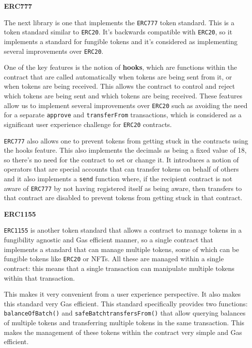 \textbf{ERC777}

The next library is one that implements the \texttt{ERC777} token
standard. This is a token standard similar to \texttt{ERC20}. It's
backwards compatible with \texttt{ERC20}, so it implements a standard
for fungible tokens and it's considered as implementing several
improvements over \texttt{ERC20}.

One of the key features is the notion of \textbf{hooks}, which are
functions within the contract that are called automatically when tokens
are being sent from it, or when tokens are being received. This allows
the contract to control and reject which tokens are being sent and which
tokens are being received. These features allow us to implement several
improvements over \texttt{ERC20} such as avoiding the need for a
separate \texttt{approve} and \texttt{transferFrom} transactions, which
is considered as a significant user experience challenge for
\texttt{ERC20} contracts.

\texttt{ERC777} also allows one to prevent tokens from getting stuck in
the contracts using the hooks feature. This also implements the decimals
as being a fixed value of 18, so there's no need for the contract to set
or change it. It introduces a notion of operators that are special
accounts that can transfer tokens on behalf of others and it also
implements a \texttt{send} function where, if the recipient contract is
not aware of \texttt{ERC777} by not having registered itself as being
aware, then transfers to that contract are disabled to prevent tokens
from getting stuck in that contract.

\textbf{ERC1155}

\texttt{ERC1155} is another token standard that allows a contract to
manage tokens in a fungibility agnostic and Gas efficient manner, so a
single contract that implements a standard that can manage multiple
tokens, some of which can be fungible tokens like \texttt{ERC20} or
NFTs. All these are managed within a single contract: this means that a
single transaction can manipulate multiple tokens within that
transaction.

This makes it very convenient from a user experience perspective. It
also makes this standard very Gas efficient. This standard specifically
provides two functions: \texttt{balanceOfBatch()} and
\texttt{safeBatchtransfersFrom()} that allow querying balances of
multiple tokens and transferring multiple tokens in the same
transaction. This makes the management of these tokens within the
contract very simple and Gas efficient.


